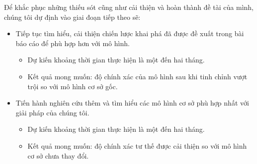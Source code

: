 Để khắc phục những thiếu sót cũng như cải thiện và hoàn thành đề tài của mình, chúng tôi dự định vào giai đoạn tiếp theo sẽ:
\begin{itemize}
	\item Tiếp tục tìm hiểu, cải thiện chiến lược khai phá đã được đề xuất trong bài báo cáo để phù hợp hơn với mô hình.
	      \begin{itemize}
		      \item Dự kiến khoảng thời gian thực hiện là một đến hai tháng.
		      \item Kết quả mong muốn: độ chính xác của mô hình sau khi tinh chỉnh vượt trội so với mô hình cơ sở gốc.
	      \end{itemize}
	\item Tiến hành nghiên cứu thêm và tìm hiểu các mô hình cơ sở phù hợp nhất với giải pháp của chúng tôi.
		\begin{itemize}
	 		\item Dự kiến khoảng thời gian thực hiện là một đến hai tháng.
		      \item Kết quả mong muốn: độ chính xác tư thế được cải thiện so với mô hình cơ sở chưa thay đổi.
		\end{itemize}
\end{itemize}
